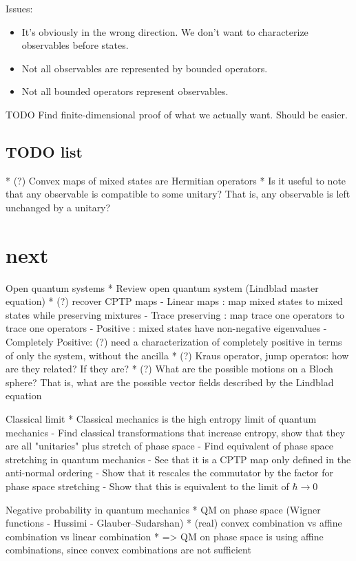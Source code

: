 Issues:
\begin{itemize}
	\item It's obviously in the wrong direction. We don't want to characterize observables before states.
	\item Not all observables are represented by bounded operators.
	\item Not all bounded operators represent observables.
\end{itemize}

TODO Find finite-dimensional proof of what we actually want. Should be easier.


\subsection{TODO list}
* (?) Convex maps of mixed states are Hermitian operators
* Is it useful to note that any observable is compatible to some unitary? That is, any observable is left unchanged by a unitary?

\section{next}
Open quantum systems
* Review open quantum system (Lindblad master equation)
* (?) recover CPTP maps 
- Linear maps : map mixed states to mixed states while preserving mixtures
- Trace preserving : map trace one operators to trace one operators
- Positive : mixed states have non-negative eigenvalues
- Completely Positive: (?) need a characterization of completely positive in terms of only the system, without the ancilla
* (?) Kraus operator, jump operatos: how are they related? If they are?
* (?) What are the possible motions on a Bloch sphere? That is, what are the possible vector fields described by the Lindblad equation

Classical limit
* Classical mechanics is the high entropy limit of quantum mechanics
- Find classical transformations that increase entropy, show that they are all "unitaries" plus stretch of phase space
- Find equivalent of phase space stretching in quantum mechanics
- See that it is a CPTP map only defined in the anti-normal ordering
- Show that it rescales the commutator by the factor for phase space stretching
- Show that this is equivalent to the limit of $\hbar \to 0$

Negative probability in quantum mechanics
* QM on phase space (Wigner functions - Hussimi - Glauber–Sudarshan)
* (real) convex combination vs affine combination vs linear combination
* => QM on phase space is using affine combinations, since convex combinations are not sufficient

